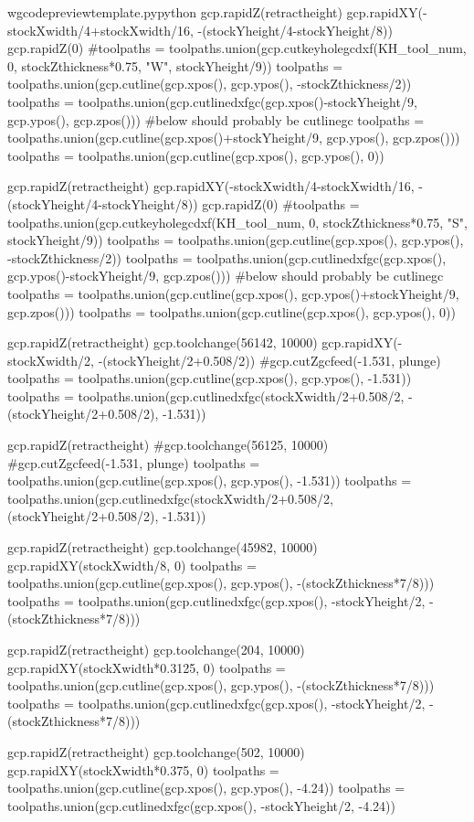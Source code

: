 \documentclass{ltxdoc}
\begin{document}
\begin{writecode}{w}{gcodepreviewtemplate.py}{python}
gcp.rapidZ(retractheight)
gcp.rapidXY(-stockXwidth/4+stockXwidth/16, -(stockYheight/4-stockYheight/8))
gcp.rapidZ(0)
#toolpaths = toolpaths.union(gcp.cutkeyholegcdxf(KH_tool_num, 0, stockZthickness*0.75, "W", stockYheight/9))
toolpaths = toolpaths.union(gcp.cutline(gcp.xpos(), gcp.ypos(), -stockZthickness/2))
toolpaths = toolpaths.union(gcp.cutlinedxfgc(gcp.xpos()-stockYheight/9, gcp.ypos(), gcp.zpos()))
#below should probably be cutlinegc
toolpaths = toolpaths.union(gcp.cutline(gcp.xpos()+stockYheight/9, gcp.ypos(), gcp.zpos()))
toolpaths = toolpaths.union(gcp.cutline(gcp.xpos(), gcp.ypos(), 0))

gcp.rapidZ(retractheight)
gcp.rapidXY(-stockXwidth/4-stockXwidth/16, -(stockYheight/4-stockYheight/8))
gcp.rapidZ(0)
#toolpaths = toolpaths.union(gcp.cutkeyholegcdxf(KH_tool_num, 0, stockZthickness*0.75, "S", stockYheight/9))
toolpaths = toolpaths.union(gcp.cutline(gcp.xpos(), gcp.ypos(), -stockZthickness/2))
toolpaths = toolpaths.union(gcp.cutlinedxfgc(gcp.xpos(), gcp.ypos()-stockYheight/9, gcp.zpos()))
#below should probably be cutlinegc
toolpaths = toolpaths.union(gcp.cutline(gcp.xpos(), gcp.ypos()+stockYheight/9, gcp.zpos()))
toolpaths = toolpaths.union(gcp.cutline(gcp.xpos(), gcp.ypos(), 0))

gcp.rapidZ(retractheight)
gcp.toolchange(56142, 10000)
gcp.rapidXY(-stockXwidth/2, -(stockYheight/2+0.508/2))
#gcp.cutZgcfeed(-1.531, plunge)
toolpaths = toolpaths.union(gcp.cutline(gcp.xpos(), gcp.ypos(), -1.531))
toolpaths = toolpaths.union(gcp.cutlinedxfgc(stockXwidth/2+0.508/2, -(stockYheight/2+0.508/2), -1.531))

gcp.rapidZ(retractheight)
#gcp.toolchange(56125, 10000)
#gcp.cutZgcfeed(-1.531, plunge)
toolpaths = toolpaths.union(gcp.cutline(gcp.xpos(), gcp.ypos(), -1.531))
toolpaths = toolpaths.union(gcp.cutlinedxfgc(stockXwidth/2+0.508/2, (stockYheight/2+0.508/2), -1.531))

gcp.rapidZ(retractheight)
gcp.toolchange(45982, 10000)
gcp.rapidXY(stockXwidth/8, 0)
toolpaths = toolpaths.union(gcp.cutline(gcp.xpos(), gcp.ypos(), -(stockZthickness*7/8)))
toolpaths = toolpaths.union(gcp.cutlinedxfgc(gcp.xpos(), -stockYheight/2, -(stockZthickness*7/8)))

gcp.rapidZ(retractheight)
gcp.toolchange(204, 10000)
gcp.rapidXY(stockXwidth*0.3125, 0)
toolpaths = toolpaths.union(gcp.cutline(gcp.xpos(), gcp.ypos(), -(stockZthickness*7/8)))
toolpaths = toolpaths.union(gcp.cutlinedxfgc(gcp.xpos(), -stockYheight/2, -(stockZthickness*7/8)))

gcp.rapidZ(retractheight)
gcp.toolchange(502, 10000)
gcp.rapidXY(stockXwidth*0.375, 0)
toolpaths = toolpaths.union(gcp.cutline(gcp.xpos(), gcp.ypos(), -4.24))
toolpaths = toolpaths.union(gcp.cutlinedxfgc(gcp.xpos(), -stockYheight/2, -4.24))


\end{writecode}
\end{document}
